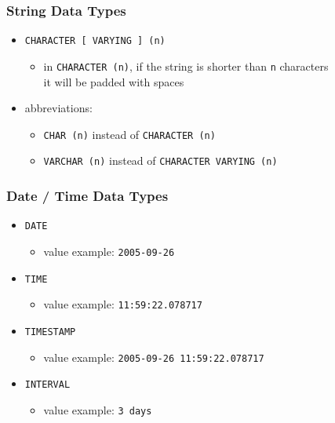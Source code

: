 \documentclass[dvipsnames]{beamer}
\theoremstyle{plain}
\begin{document}
\begin{frame}
  \frametitle{String Data Types}

  \begin{itemize}
    \item \texttt{CHARACTER [ VARYING ] (n)}
    \begin{itemize}
      \item in \texttt{CHARACTER (n)}, if the string is shorter than
        \texttt{n} characters\\
        it will be padded with spaces
    \end{itemize}

    \item abbreviations:
    \begin{itemize}
      \item \texttt{CHAR (n)} instead of \texttt{CHARACTER (n)}
      \item \texttt{VARCHAR (n)} instead of \texttt{CHARACTER VARYING (n)}
    \end{itemize}
  \end{itemize}
\end{frame}

\begin{frame}
  \frametitle{Date / Time Data Types}

  \begin{itemize}
    \item \texttt{DATE}
    \begin{itemize}
      \item value example: \texttt{2005-09-26}
    \end{itemize}

    \medskip
    \item \texttt{TIME}
    \begin{itemize}
      \item value example: \texttt{11:59:22.078717}
    \end{itemize}

    \medskip
    \item \texttt{TIMESTAMP}
    \begin{itemize}
      \item value example: \texttt{2005-09-26 11:59:22.078717}
    \end{itemize}

    \medskip
    \item \texttt{INTERVAL}
    \begin{itemize}
      \item value example: \texttt{3 days}
    \end{itemize}
  \end{itemize}
\end{frame}
\end{document}
